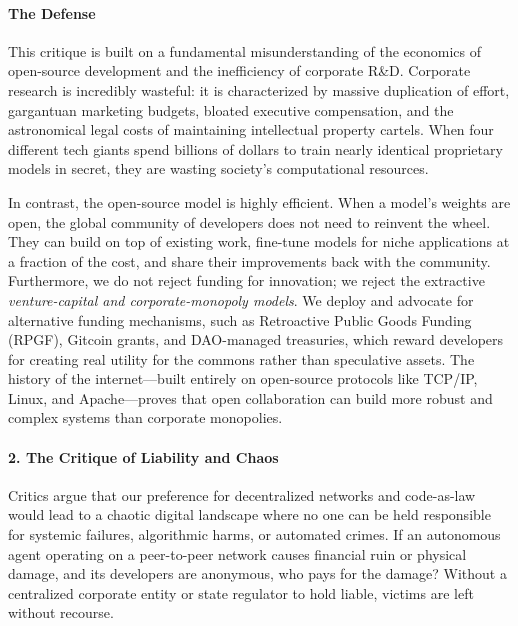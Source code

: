 \paragraph{The Defense}\label{the-defense}

This critique is built on a fundamental misunderstanding of the
economics of open-source development and the inefficiency of corporate
R\&D. Corporate research is incredibly wasteful: it is characterized by
massive duplication of effort, gargantuan marketing budgets, bloated
executive compensation, and the astronomical legal costs of maintaining
intellectual property cartels. When four different tech giants spend
billions of dollars to train nearly identical proprietary models in
secret, they are wasting society's computational resources.

In contrast, the open-source model is highly efficient. When a model's
weights are open, the global community of developers does not need to
reinvent the wheel. They can build on top of existing work, fine-tune
models for niche applications at a fraction of the cost, and share their
improvements back with the community. Furthermore, we do not reject
funding for innovation; we reject the extractive \emph{venture-capital
and corporate-monopoly models}. We deploy and advocate for alternative
funding mechanisms, such as Retroactive Public Goods Funding (RPGF),
Gitcoin grants, and DAO-managed treasuries, which reward developers for
creating real utility for the commons rather than speculative assets.
The history of the internet---built entirely on open-source protocols
like TCP/IP, Linux, and Apache---proves that open collaboration can
build more robust and complex systems than corporate monopolies.

\paragraph{2. The Critique of Liability and
Chaos}\label{the-critique-of-liability-and-chaos}

Critics argue that our preference for decentralized networks and
code-as-law would lead to a chaotic digital landscape where no one can
be held responsible for systemic failures, algorithmic harms, or
automated crimes. If an autonomous agent operating on a peer-to-peer
network causes financial ruin or physical damage, and its developers are
anonymous, who pays for the damage? Without a centralized corporate
entity or state regulator to hold liable, victims are left without
recourse.

